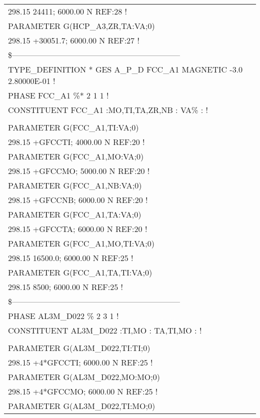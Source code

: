 \begin{longtable}[H]{ l l l }
	\multicolumn{3}{l}{298.15  24411; 6000.00 N REF:28 !}\\
	PARAMETER G(HCP\_A3,ZR,TA:VA;0) & & \\
	\multicolumn{3}{l}{298.15 +30051.7; 6000.00 N REF:27 !}\\
	\multicolumn{3}{l}{\$---------------------------------------------------------------}\\
	\multicolumn{3}{l}{TYPE\_DEFINITION * GES A\_P\_D FCC\_A1 MAGNETIC  -3.0    2.80000E-01 !}\\
	\multicolumn{3}{l}{PHASE FCC\_A1  \%*  2 1   1 !}\\
	\multicolumn{3}{l}{CONSTITUENT FCC\_A1  :MO,TI,TA,ZR,NB : VA\% :  !}\\
	& & \\
	PARAMETER G(FCC\_A1,TI:VA;0) & & \\
	\multicolumn{3}{l}{298.15 +GFCCTI; 4000.00 N REF:20 !}\\
	PARAMETER G(FCC\_A1,MO:VA;0) & & \\
	\multicolumn{3}{l}{298.15 +GFCCMO; 5000.00 N REF:20 !}\\
	PARAMETER G(FCC\_A1,NB:VA;0) & & \\
	\multicolumn{3}{l}{298.15 +GFCCNB; 6000.00 N REF:20 !}\\
	PARAMETER G(FCC\_A1,TA:VA;0) & & \\
	\multicolumn{3}{l}{298.15 +GFCCTA; 6000.00 N REF:20 !}\\
	PARAMETER G(FCC\_A1,MO,TI:VA;0) & & \\
	\multicolumn{3}{l}{298.15   16500.0; 6000.00 N REF:25 !}\\
	PARAMETER G(FCC\_A1,TA,TI:VA;0) & & \\
	\multicolumn{3}{l}{298.15  8500; 6000.00 N REF:25 !}\\
	\multicolumn{3}{l}{\$---------------------------------------------------------------}\\
	\multicolumn{3}{l}{PHASE AL3M\_D022  \%  2 3   1 !}\\
	\multicolumn{3}{l}{CONSTITUENT AL3M\_D022  :TI,MO : TA,TI,MO :  !}\\
	& & \\
	PARAMETER G(AL3M\_D022,TI:TI;0) & & \\
	\multicolumn{3}{l}{298.15 +4*GFCCTI; 6000.00 N REF:25 !}\\
	PARAMETER G(AL3M\_D022,MO:MO;0) & & \\
	\multicolumn{3}{l}{298.15 +4*GFCCMO; 6000.00 N REF:25 !}\\
	PARAMETER G(AL3M\_D022,TI:MO;0) & & \\

\end{longtable}
